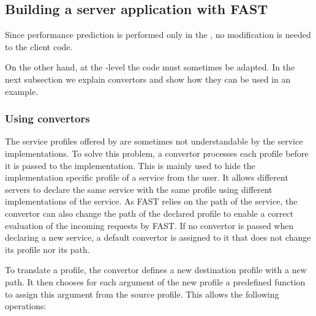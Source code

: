 \subsection{Building a server application with FAST}

Since performance prediction is performed only in the \diet \sed, no
modification is needed to the client code.

On the other hand, at the \sed-level the code must sometimes be adapted.  In
the next subsection we explain convertors and show how they can be used in an
example.

\subsubsection{Using convertors}

The service profiles offered by \diet are sometimes not understandable by the
service implementations. To solve this problem, a convertor processes each
profile before it is passed to the implementation. This is mainly used to hide
the implementation specific profile of a service from the user. It allows
different servers to declare the same service with the same profile using
different implementations of the service. As FAST relies on the path of the
service, the convertor can also change the path of the declared profile to
enable a correct evaluation of the incoming requests by FAST.  If no convertor
is passed when declaring a new service, a default convertor is assigned to it
that does not change its profile nor its path.

To translate a profile, the convertor defines a new destination profile with a
new path. It then chooses for each argument of the new profile a predefined
function to assign this argument from the source profile. This allows the
following operations:

